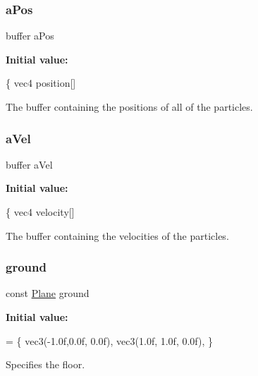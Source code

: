 \subsubsection{\texorpdfstring{a\+Pos}{aPos}}
{\footnotesize\ttfamily buffer a\+Pos}

{\bfseries Initial value\+:}
\begin{DoxyCode}
\{
    vec4 position[]
\end{DoxyCode}


The buffer containing the positions of all of the particles. 

\mbox{\label{bouncing__particles_8comp_a8873b6c4414371b20f8c9adb4fbb0b0e}} 
\subsubsection{\texorpdfstring{a\+Vel}{aVel}}
{\footnotesize\ttfamily buffer a\+Vel}

{\bfseries Initial value\+:}
\begin{DoxyCode}
\{
    vec4 velocity[]
\end{DoxyCode}


The buffer containing the velocities of the particles. 

\mbox{\label{bouncing__particles_8comp_ad95bc51bdd453bc39861ab0250f2bc14}} 
\subsubsection{\texorpdfstring{ground}{ground}}
{\footnotesize\ttfamily const \hyperlink{struct_plane}{Plane} ground}

{\bfseries Initial value\+:}
\begin{DoxyCode}
= 
\{
    vec3(-1.0f,0.0f, 0.0f),
    vec3(1.0f, 1.0f, 0.0f),
\}
\end{DoxyCode}


Specifies the floor. 

